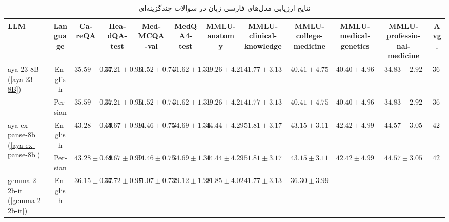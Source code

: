 \documentclass[11pt, a4paper, oneside]{book}
\begin{document}
				\begin{table}
					\centering
					\caption{نتایج ارزیابی مدل‌های فارسی زبان در سوالات چندگزینه‌ای}
					\begin{latin}
						\begin{adjustbox}{max width=\textheight}
							\begin{tabular}{lccccccccccc}
								\toprule
								\textbf{LLM} &
								\textbf{Language} &
								\textbf{CareQA} &
								\textbf{HeadQA-test} &
								\textbf{MedMCQA-val} &
								\textbf{MedQA4-test} &
								\textbf{MMLU-anatomy} &
								\textbf{MMLU-clinical-knowledge} &
								\textbf{MMLU-college-medicine} &
								\textbf{MMLU-medical-genetics} &
								\textbf{MMLU-professional-medicine} &
								\textbf{Avg.}
								\\
								\midrule
								\multirow{2}{*}{aya-23-8B (\ref{aya-23-8B})} &
								English &
								$35.59 \pm 0.67$ &
								$37.21 \pm 0.96$ &
								$31.52 \pm 0.74$ &
								$31.62 \pm 1.31$ &
								$39.26 \pm 4.21$ &
								$41.77 \pm 3.13$ &
								$40.41 \pm 4.75$ &
								$40.40 \pm 4.96$ &
								$34.83 \pm 2.92$ &
								$36.96$ 
								\\ &
								Persian &
								$35.59 \pm 0.67$ &
								$37.21 \pm 0.96$ &
								$31.52 \pm 0.74$ &
								$31.62 \pm 1.31$ &
								$39.26 \pm 4.21$ &
								$41.77 \pm 3.13$ &
								$40.41 \pm 4.75$ &
								$40.40 \pm 4.96$ &
								$34.83 \pm 2.92$ &
								$36.96$ 
								\\
								\midrule
								\multirow{2}{*}{aya-expanse-8b (\ref{aya-expanse-8b})} &
								English &
								$43.28 \pm 0.69$ &
								$44.67 \pm 0.99$ &
								$34.46 \pm 0.75$ &
								$34.69 \pm 1.34$ &
								$44.44 \pm 4.29$ &
								$51.81 \pm 3.17$ &
								$43.15 \pm 3.11$ &
								$42.42 \pm 4.99$ &
								$44.57 \pm 3.05$ &
								$42.61$
								\\ &
								Persian &
								$43.28 \pm 0.69$ &
								$44.67 \pm 0.99$ &
								$34.46 \pm 0.75$ &
								$34.69 \pm 1.34$ &
								$44.44 \pm 4.29$ &
								$51.81 \pm 3.17$ &
								$43.15 \pm 3.11$ &
								$42.42 \pm 4.99$ &
								$44.57 \pm 3.05$ &
								$42.61$
								\\
								\midrule
								\multirow{2}{*}{gemma-2-2b-it (\ref{gemma-2-2b-it})} &
								English &
								$36.15 \pm 0.67$ &
								$37.72 \pm 0.97$ &
								$31.07 \pm 0.73$ &
								$29.12 \pm 1.28$ &
								$31.85 \pm 4.02$ &
								$41.77 \pm 3.13$ &
								$36.30 \pm 3.99$ &

\end{tabular}
\end{adjustbox}
\end{latin}
\end{table}
\end{document}
